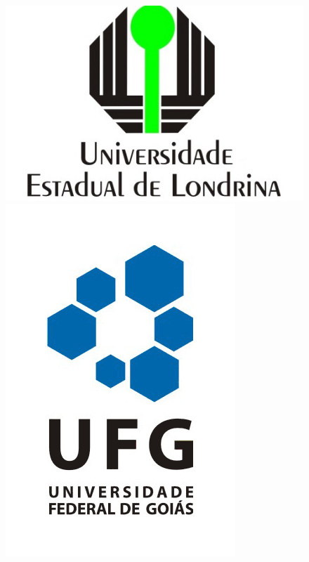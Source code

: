 \documentclass[a4paper,11pt]{article}
\begin{document}
\begin{titlepage}

\newcommand{\HRule}{\rule{\linewidth}{0.5mm}} %

\begin{center} %
 

\begin{figure}
\centering
\begin{minipage}{.5\textwidth}
  \centering
  \includegraphics[width=.4\linewidth,scale=1.3]{logo-uel}
\end{minipage}%
\begin{minipage}{.5\textwidth}
  \centering
  \includegraphics[scale=0.2]{logo-ufg}


\end{minipage}
\end{figure}
\end{center}
\end{titlepage}
\end{document}

